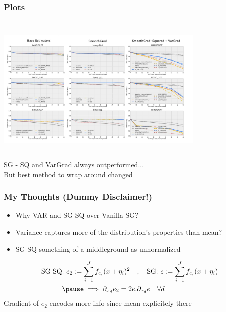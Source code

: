 \documentclass{beamer}
\theoremstyle{mystyle}
\begin{document}
\begin{frame}
	\frametitle{Plots}
	\includegraphics[width = 10cm, height=7.2cm]{all_the_plots.png}\\
	SG - SQ and VarGrad always outperformed... \pause
	\\
	But best method to wrap around changed

\end{frame}
\begin{frame}
	\frametitle{My Thoughts (Dummy Disclaimer!)}
	\begin{itemize}
	\item Why VAR and SG-SQ over Vanilla SG? \\ \pause 
	\item Variance captures more of the distribution's properties than mean?\\ \pause
	\item SG-SQ something of a middleground as unnormalized \\ \pause
	\end{itemize}
	\begin{align*}
		\text{SG-SQ:  } e_2 := \sum_{i=1}^{J} {f_{c_i} (x+\eta_i)^2} \quad &, \quad \text{SG:  } e := \sum_{i=1}^{J} {f_{c_i}(x+\eta_i)} \\
	\pause
		\implies \partial_{x_d} e_2 = 2 e . &\partial_{ x_d} e   \quad  \forall d
	\end{align*}
	\pause
	Gradient of $e_2$ encodes more info since mean explicitely there
\end{frame} 
\end{document}
